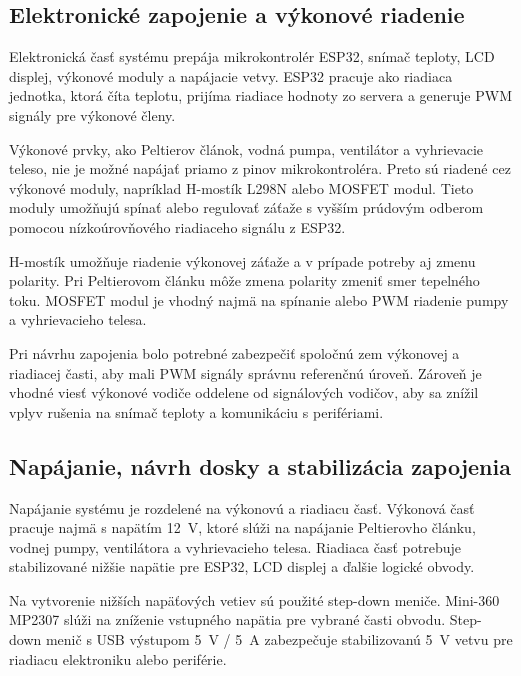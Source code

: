 \subsection{Elektronické zapojenie a výkonové riadenie}

Elektronická časť systému prepája mikrokontrolér ESP32, snímač teploty, LCD displej, 
výkonové moduly a napájacie vetvy. ESP32 pracuje ako riadiaca jednotka, ktorá číta teplotu, 
prijíma riadiace hodnoty zo servera a generuje PWM signály pre výkonové členy.

Výkonové prvky, ako Peltierov článok, vodná pumpa, ventilátor a vyhrievacie teleso, 
nie je možné napájať priamo z pinov mikrokontroléra. Preto sú riadené cez výkonové moduly, 
napríklad H-mostík L298N alebo MOSFET modul. Tieto moduly umožňujú spínať alebo regulovať 
záťaže s vyšším prúdovým odberom pomocou nízkoúrovňového riadiaceho signálu z ESP32.

H-mostík umožňuje riadenie výkonovej záťaže a v prípade potreby aj zmenu polarity. Pri 
Peltierovom článku môže zmena polarity zmeniť smer tepelného toku. MOSFET modul je vhodný 
najmä na spínanie alebo PWM riadenie pumpy a vyhrievacieho telesa.

Pri návrhu zapojenia bolo potrebné zabezpečiť spoločnú zem výkonovej a riadiacej časti, 
aby mali PWM signály správnu referenčnú úroveň. Zároveň je vhodné viesť výkonové vodiče 
oddelene od signálových vodičov, aby sa znížil vplyv rušenia na snímač teploty a komunikáciu s perifériami.

\begin{figure}[H]
    \centering
    \label{fig:schema_zapojenia}
\end{figure}

\subsection{Napájanie, návrh dosky a stabilizácia zapojenia}

Napájanie systému je rozdelené na výkonovú a riadiacu časť. Výkonová časť pracuje najmä s 
napätím 12~V, ktoré slúži na napájanie Peltierovho článku, vodnej pumpy, ventilátora a 
vyhrievacieho telesa. Riadiaca časť potrebuje stabilizované nižšie napätie pre ESP32, 
LCD displej a ďalšie logické obvody.

Na vytvorenie nižších napäťových vetiev sú použité step-down meniče. Mini-360 MP2307 slúži 
na zníženie vstupného napätia pre vybrané časti obvodu. Step-down menič s USB výstupom 
5~V / 5~A zabezpečuje stabilizovanú 5~V vetvu pre riadiacu elektroniku alebo periférie.

